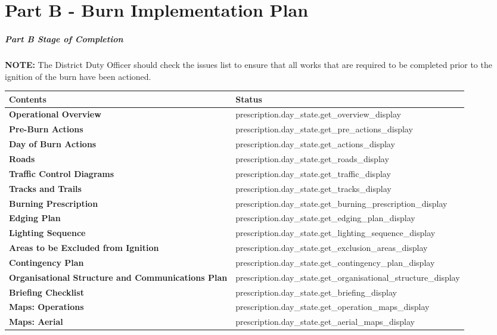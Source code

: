 \part{Part B - Burn Implementation Plan}
\subsubsection{Part B Stage of Completion}
{\textsc \textbf{NOTE:} The District Duty Officer should check the issues list to ensure that all works that are required to be completed prior to the ignition of the burn have been actioned.}
\newline\newline
\begin{tabu} to \linewidth { | X[l] | X[c] | }
\hline
\textbf{Contents} & \textbf{Status} \\
\hline
\textbf{Operational Overview} & {{ prescription.day_state.get_overview_display }} \\
\textbf{Pre-Burn Actions} & {{ prescription.day_state.get_pre_actions_display }} \\
\textbf{Day of Burn Actions} & {{ prescription.day_state.get_actions_display }} \\
\textbf{Roads} & {{ prescription.day_state.get_roads_display }} \\
\textbf{Traffic Control Diagrams} & {{ prescription.day_state.get_traffic_display }} \\
\textbf{Tracks and Trails} & {{ prescription.day_state.get_tracks_display }} \\
\textbf{Burning Prescription} & {{ prescription.day_state.get_burning_prescription_display }} \\
\textbf{Edging Plan} & {{ prescription.day_state.get_edging_plan_display }} \\
\textbf{Lighting Sequence} & {{ prescription.day_state.get_lighting_sequence_display }} \\
\textbf{Areas to be Excluded from Ignition} & {{ prescription.day_state.get_exclusion_areas_display }} \\
\textbf{Contingency Plan} & {{ prescription.day_state.get_contingency_plan_display }} \\
\textbf{Organisational Structure and Communications Plan} & {{ prescription.day_state.get_organisational_structure_display }} \\
\textbf{Briefing Checklist} & {{ prescription.day_state.get_briefing_display }} \\
\textbf{Maps: Operations} & {{ prescription.day_state.get_operation_maps_display }} \\
\textbf{Maps: Aerial} & {{ prescription.day_state.get_aerial_maps_display }} \\
\hline
\end{tabu}
